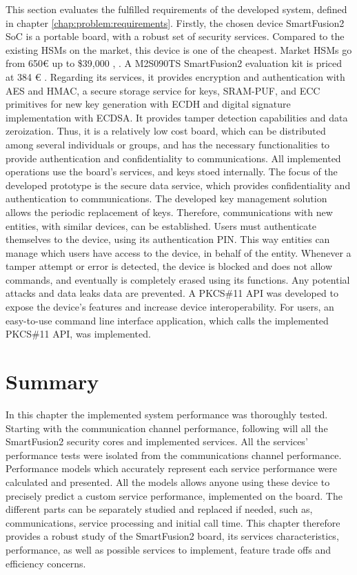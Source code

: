 This section evaluates the fulfilled requirements of the developed system, defined in chapter \ref{chap:problem:requirements}.
Firstly, the chosen device SmartFusion2 SoC is a portable board, with a robust set of security services.
Compared to the existing HSMs on the market, this device is one of the cheapest. Market \ac{HSM}s go from 650€ up to \$39,000 \cite{HSMpriceArticles}, \cite{HSMPresentationPrices}. A M2S090TS SmartFusion2 evaluation kit is priced at 384 € \cite{smartfusionPrice}.
Regarding its services, it provides encryption and authentication with \ac{AES} and \ac{HMAC}, a secure storage service for keys, SRAM-PUF, and \ac{ECC} primitives for new key generation with \ac{ECDH} and digital signature implementation with \ac{ECDSA}. It provides tamper detection capabilities and data zeroization.
Thus, it is a relatively low cost board, which can be distributed among several individuals or groups, and has the necessary functionalities to provide authentication and confidentiality to communications.
All implemented operations use the board's services, and keys stoed internally.
The focus of the developed prototype is the secure data service, which provides confidentiality and authentication to communications.
The developed key management solution allows the periodic replacement of keys. Therefore, communications with new entities, with similar devices, can be established.
Users must authenticate themselves to the device, using its authentication PIN. This way entities can manage which users have access to the device, in behalf of the entity.
Whenever a tamper attempt or error is detected, the device is blocked and does not allow commands, and eventually is completely erased using its functions. Any potential attacks and data leaks data are prevented.
A PKCS\#11 API was developed to expose the device's features and increase device interoperability. For users, an easy-to-use command line interface application, which calls the implemented PKCS\#11 API, was implemented.

\section*{Summary}\label{chap:evaluation:summary}

In this chapter the implemented system performance was thoroughly tested. Starting with the communication channel performance, following will all the SmartFusion2 security cores and implemented services. All the services' performance tests were isolated from the communications channel performance. Performance models which accurately represent each service performance were calculated and presented. All the models allows anyone using these device to precisely predict a custom service performance, implemented on the board. The different parts can be separately studied and replaced if needed, such as, communications, service processing and initial call time. This chapter therefore provides a robust study of the SmartFusion2 board, its services characteristics, performance, as well as possible services to implement, feature trade offs and efficiency concerns.
